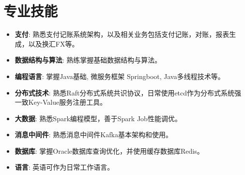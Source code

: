 \documentclass{resume}
\begin{document}
\newpage
{}


\section{专业技能}
\begin{itemize}[parsep=0.2ex]
  \item \textbf{支付}: 熟悉支付记账系统架构，以及相关业务包括支付记账，对账，报表生成，以及换汇FX等。
  \item \textbf{数据结构与算法}: 熟练掌握基础数据结构与算法。
  \item \textbf{编程语言}: 掌握Java基础, 微服务框架 Springboot, Java多线程技术等。
  \item \textbf{分布式技术}: 熟悉Raft分布式系统共识协议，日常使用etcd作为分布式系统强一致Key-Value服务注册工具。
  \item \textbf{大数据}: 熟悉Spark编程模型，善于Spark Job性能调优。
  \item \textbf{消息中间件}: 熟悉消息中间件Kafka基本架构和使用。
  \item \textbf{数据库}: 掌握Oracle数据库查询优化，并使用缓存数据库Redis。
  \item \textbf{语言}: 英语可作为日常工作语言。
\end{itemize}
\end{document}
